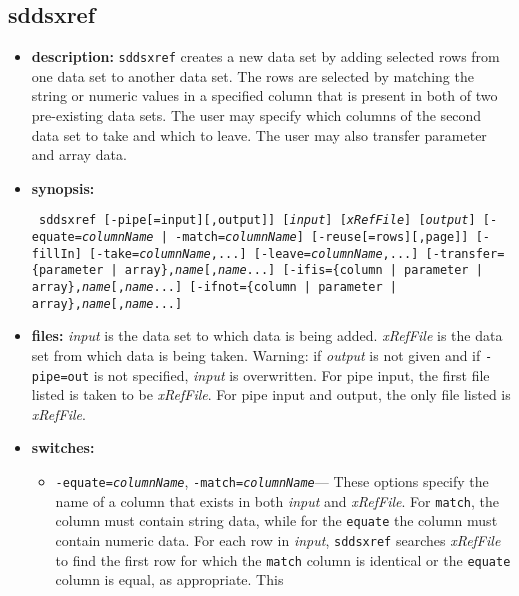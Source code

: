 
\newpage
\subsection{sddsxref}
\label{sddsxref}

\begin{itemize}
\item {\bf description:}
\verb|sddsxref| creates a new data set by adding selected rows from one data set to another data set.
The rows are selected by matching the string or numeric values in a specified column that is present in both of
two pre-existing data sets.  The user may specify which columns of the second data set to take and which to leave.
The user may also transfer parameter and array data.
\item {\bf synopsis:} 
\begin{flushleft}{\tt
sddsxref [-pipe[=input][,output]] [{\em input}] [{\em xRefFile}] [{\em output}]
[-equate={\em columnName} | -match={\em columnName}]
[-reuse[=rows][,page]] [-fillIn]
[-take={\em columnName},...] [-leave={\em columnName},...] 
[-transfer=\{parameter | array\},{\em name}[,{\em name}...]
[-ifis=\{column | parameter | array\},{\em name}[,{\em name}...]
[-ifnot=\{column | parameter | array\},{\em name}[,{\em name}...]
}\end{flushleft}
\item {\bf files:}
        {\em input} is the data set to which data is being added.  {\em xRefFile} is the data set from
        which data is being taken.  Warning: if {\em output} is not given and if {\tt -pipe=out} is not
        specified, {\em input} is overwritten.  For pipe input, the first file listed is taken to be
        {\em xRefFile}.  For pipe input and output, the only file listed is {\em xRefFile}.
\item {\bf switches:}
    \begin{itemize}
    \item {\tt -equate={\em columnName}}, {\tt -match={\em columnName}}--- 
        These options specify the name of a column that exists in both
        {\em input} and {\em xRefFile}.  For \verb|match|, the column must contain string data, while for the 
        \verb|equate| the column must contain numeric data.  For each row in {\em input}, \verb|sddsxref|
        searches {\em xRefFile} to find the first row for which the \verb|match| column is identical or
        the \verb|equate| column is equal, as appropriate.  This

\end{itemize}
\end{itemize}
